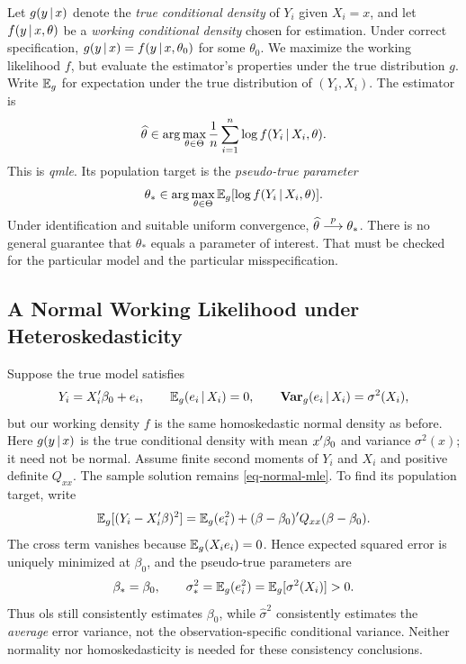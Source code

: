 \documentclass[a4paper,12pt]{article}
\begin{document}
Let $g(y\mathpunct{}|\mathpunct{} x)$ denote the \emph{true conditional density} of $Y_i$ given $X_i=x$,
and let $f(y\mathpunct{}|\mathpunct{} x,\theta)$ be a \emph{working conditional density} chosen for estimation.
Under correct specification, $g(y\mathpunct{}|\mathpunct{} x)=f(y\mathpunct{}|\mathpunct{} x,\theta_0)$ for some $\theta_0$.
We maximize the working likelihood $f$, but evaluate the estimator's properties under the true distribution $g$.
Write $\operatorname{\mathbb{E}}_g$ for expectation under the true distribution of $(Y_i,X_i)$.
The estimator is
\begin{align}
	\widehat\theta\in\arg\max_{\theta\in\Theta}
	\frac1n\sum_{i=1}^n\log f(Y_i\mathpunct{}|\mathpunct{} X_i,\theta).
\end{align}
This is \emph{\gls{qmle}}.
Its population target is the \emph{pseudo-true parameter}
\begin{align}
	\theta_*
	\in \arg\max_{\theta\in\Theta} \operatorname{\mathbb{E}}_g[\log f(Y_i\mathpunct{}|\mathpunct{} X_i,\theta)].
\end{align}
Under identification and suitable uniform convergence, $\widehat\theta\overset{p}{\longrightarrow}\theta_*$.
There is no general guarantee that $\theta_*$ equals a parameter of interest.
That must be checked for the particular model and the particular misspecification.

\subsection{A Normal Working Likelihood under Heteroskedasticity}

Suppose the true model satisfies
\begin{align}\label{eq-heteroskedastic-model}
	Y_i=X_i^{\prime}\beta_0+e_i,
	\qquad \operatorname{\mathbb{E}}_g(e_i\mathpunct{}|\mathpunct{} X_i)=0,
	\qquad \operatorname{\text{\textrm{\upshape\textbf{Var}}}}_g(e_i\mathpunct{}|\mathpunct{} X_i)=\sigma^2(X_i),
\end{align}
but our working density $f$ is the same homoskedastic normal density as before.
Here $g(y\mathpunct{}|\mathpunct{} x)$ is the true conditional density with mean $x^{\prime}\beta_0$
and variance $\sigma^2(x)$; it need not be normal.
Assume finite second moments of $Y_i$ and $X_i$ and positive definite $Q_{xx}$.
The sample solution remains \eqref{eq-normal-mle}.
To find its population target, write
\begin{align}
	\operatorname{\mathbb{E}}_g[(Y_i-X_i^{\prime}\beta)^2]
	=\operatorname{\mathbb{E}}_g(e_i^2)+(\beta-\beta_0)^{\prime} Q_{xx}(\beta-\beta_0).
\end{align}
The cross term vanishes because $\operatorname{\mathbb{E}}_g(X_ie_i)=0$.
Hence expected squared error is uniquely minimized at $\beta_0$, and the pseudo-true parameters are
\begin{align}
	\beta_*=\beta_0,
	\qquad \sigma_*^2=\operatorname{\mathbb{E}}_g(e_i^2)=\operatorname{\mathbb{E}}_g[\sigma^2(X_i)]>0.
\end{align}
Thus \gls{ols} still consistently estimates $\beta_0$,
while $\widehat\sigma^2$ consistently estimates the \emph{average} error variance,
not the observation-specific conditional variance.
Neither normality nor homoskedasticity is needed for these consistency conclusions.
\end{document}
